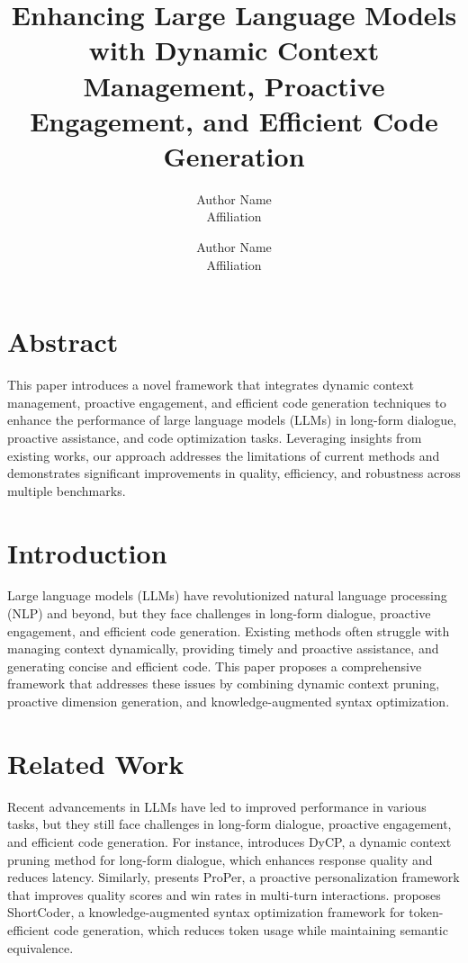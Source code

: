 \documentclass[11pt]{article}
\title{Enhancing Large Language Models with Dynamic Context Management, Proactive Engagement, and Efficient Code Generation}
\author{Author Name \\ Affiliation \\ \and Author Name \\ Affiliation}
\date{}
\begin{document}
\maketitle

\section{Abstract}
This paper introduces a novel framework that integrates dynamic context management, proactive engagement, and efficient code generation techniques to enhance the performance of large language models (LLMs) in long-form dialogue, proactive assistance, and code optimization tasks. Leveraging insights from existing works, our approach addresses the limitations of current methods and demonstrates significant improvements in quality, efficiency, and robustness across multiple benchmarks.

\section{Introduction}
\label{sec:introduction}
Large language models (LLMs) have revolutionized natural language processing (NLP) and beyond, but they face challenges in long-form dialogue, proactive engagement, and efficient code generation. Existing methods often struggle with managing context dynamically, providing timely and proactive assistance, and generating concise and efficient code. This paper proposes a comprehensive framework that addresses these issues by combining dynamic context pruning, proactive dimension generation, and knowledge-augmented syntax optimization.

\section{Related Work}
\label{sec:related_work}
Recent advancements in LLMs have led to improved performance in various tasks, but they still face challenges in long-form dialogue, proactive engagement, and efficient code generation. For instance, \cite{choi2026dycpdynamiccontextpruning} introduces DyCP, a dynamic context pruning method for long-form dialogue, which enhances response quality and reduces latency. Similarly, \cite{kaur2026properapproachproactivitybenchmarking} presents ProPer, a proactive personalization framework that improves quality scores and win rates in multi-turn interactions. \cite{liu2026shortcoderknowledgeaugmentedsyntaxoptimization} proposes ShortCoder, a knowledge-augmented syntax optimization framework for token-efficient code generation, which reduces token usage while maintaining semantic equivalence.
\end{document}
